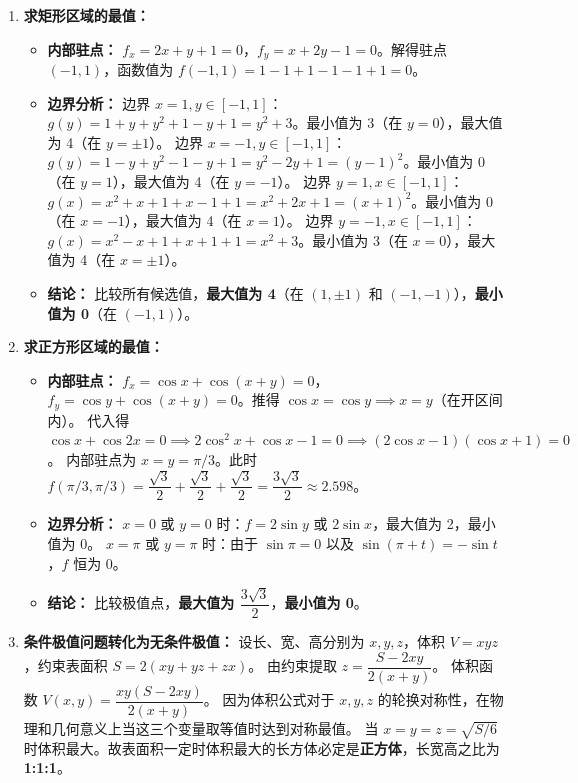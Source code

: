 \documentclass[lang=cn,11pt]{elegantbook}
\begin{document}
\begin{solution}
\begin{enumerate}
  \item[(1)] \textbf{求矩形区域的最值：}
  \begin{itemize}
    \item \textbf{内部驻点：} $f_x = 2x+y+1 = 0$，$f_y = x+2y-1 = 0$。解得驻点 $(-1,1)$，函数值为 $f(-1,1) = 1-1+1-1-1+1 = 0$。
    \item \textbf{边界分析：}
          边界 $x=1, y \in [-1,1]$：$g(y) = 1+y+y^2+1-y+1 = y^2+3$。最小值为 3（在 $y=0$），最大值为 4（在 $y=\pm 1$）。
          边界 $x=-1, y \in [-1,1]$：$g(y) = 1-y+y^2-1-y+1 = y^2-2y+1 = (y-1)^2$。最小值为 0（在 $y=1$），最大值为 4（在 $y=-1$）。
          边界 $y=1, x \in [-1,1]$：$g(x) = x^2+x+1+x-1+1 = x^2+2x+1 = (x+1)^2$。最小值为 0（在 $x=-1$），最大值为 4（在 $x=1$）。
          边界 $y=-1, x \in [-1,1]$：$g(x) = x^2-x+1+x+1+1 = x^2+3$。最小值为 3（在 $x=0$），最大值为 4（在 $x=\pm 1$）。
    \item \textbf{结论：} 比较所有候选值，\textbf{最大值为 4}（在 $(1,\pm 1)$ 和 $(-1,-1)$），\textbf{最小值为 0}（在 $(-1,1)$）。
  \end{itemize}

  \item[(2)] \textbf{求正方形区域的最值：}
  \begin{itemize}
    \item \textbf{内部驻点：} $f_x = \cos x+\cos(x+y) = 0$，$f_y = \cos y+\cos(x+y) = 0$。推得 $\cos x = \cos y \implies x=y$（在开区间内）。
          代入得 $\cos x + \cos 2x = 0 \implies 2\cos^2x + \cos x - 1 = 0 \implies (2\cos x-1)(\cos x+1) = 0$。
          内部驻点为 $x=y=\pi/3$。此时 $f(\pi/3, \pi/3) = \dfrac{\sqrt{3}}{2} + \dfrac{\sqrt{3}}{2} + \dfrac{\sqrt{3}}{2} = \dfrac{3\sqrt{3}}{2} \approx 2.598$。
    \item \textbf{边界分析：}
          $x=0$ 或 $y=0$ 时：$f = 2\sin y$ 或 $2\sin x$，最大值为 2，最小值为 0。
          $x=\pi$ 或 $y=\pi$ 时：由于 $\sin \pi = 0$ 以及 $\sin(\pi+t) = -\sin t$，$f$ 恒为 0。
    \item \textbf{结论：} 比较极值点，\textbf{最大值为 $\dfrac{3\sqrt{3}}{2}$}，\textbf{最小值为 0}。
  \end{itemize}

  \item[(3)] \textbf{条件极值问题转化为无条件极值：}
  设长、宽、高分别为 $x,y,z$，体积 $V = xyz$，约束表面积 $S = 2(xy+yz+zx)$。
  由约束提取 $z = \dfrac{S-2xy}{2(x+y)}$。
  体积函数 $V(x,y) = \dfrac{xy(S-2xy)}{2(x+y)}$。
  因为体积公式对于 $x, y, z$ 的轮换对称性，在物理和几何意义上当这三个变量取等值时达到对称最值。
  当 $x=y=z = \sqrt{S/6}$ 时体积最大。故表面积一定时体积最大的长方体必定是\textbf{正方体}，长宽高之比为 \textbf{1:1:1}。
\end{enumerate}
\end{solution}
\end{document}
